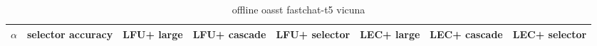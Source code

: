 \begin{table}[ht]
\begin{center}
\begin{tabular}{ cp{3.5em}p{3.2em}p{3.2em}p{3.2em}p{3.2em}p{3.2em}p{3.2em} }
  \toprule
  $\alpha$ & selector accuracy & LFU+ large & LFU+ cascade & LFU+ selector & LEC+ large & LEC+ cascade & LEC+ selector \\ 
  \bottomrule
\end{tabular}
\end{center}
\caption{offline oasst fastchat-t5 vicuna}
\label{tab:offline_oasst_fastchat-t5_vicuna}
\end{table}
